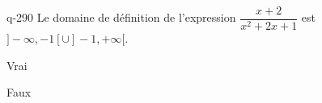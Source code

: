 \begin{truefalse}{q-290}
Le domaine de définition de l'expression $\dfrac{x+2}{x^2+2x+1}$ est $]-\infty,-1[\cup ]-1,+\infty[$.
\item* Vrai
\item Faux
\end{truefalse}

